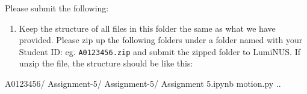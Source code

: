 \documentclass[11pt]{article}
\providecommand{\tightlist}{%
      \setlength{\itemsep}{0pt}\setlength{\parskip}{0pt}}
\newenvironment{Shaded}{}{}
\newcommand{\NormalTok}[1]{{#1}}
\newcommand{\ExtensionTok}[1]{{#1}}
\begin{document}
Please submit the following:

\begin{enumerate}
\def\labelenumi{\arabic{enumi})}
\tightlist
\item
  Keep the structure of all files in this folder the same as what we
  have provided. Please zip up the following folders under a folder
  named with your Student ID: eg. \texttt{A0123456.zip} and submit the
  zipped folder to LumiNUS. If unzip the file, the structure should be
  like this:
\end{enumerate}

\begin{Shaded}
\begin{Highlighting}[]
\ExtensionTok{A0123456/}
  \ExtensionTok{Assignment-5/}
    \ExtensionTok{Assignment-5/}
        \ExtensionTok{Assignment}\NormalTok{ 5.ipynb}
        \ExtensionTok{motion.py}
        \ExtensionTok{..}
\end{Highlighting}
\end{Shaded}


    
    
    
    
\end{document}
